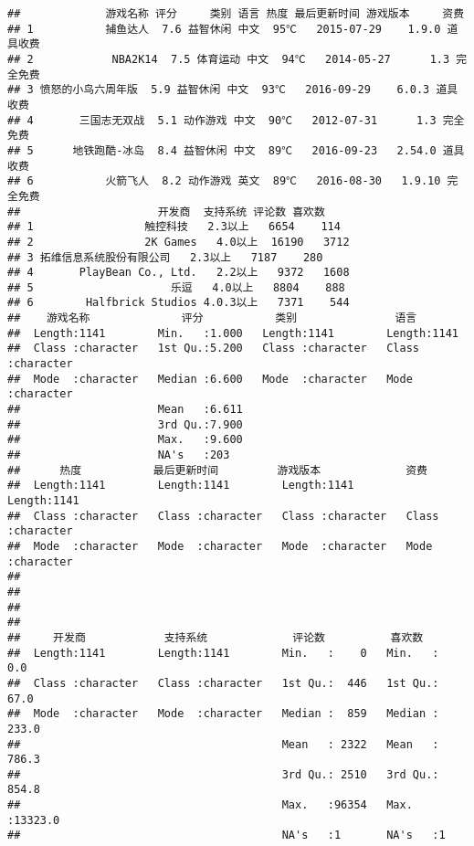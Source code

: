 \documentclass[
]{article}
\begin{document}
\begin{verbatim}
##             游戏名称 评分     类别 语言 热度 最后更新时间 游戏版本     资费
## 1           捕鱼达人  7.6 益智休闲 中文  95℃   2015-07-29    1.9.0 道具收费
## 2            NBA2K14  7.5 体育运动 中文  94℃   2014-05-27      1.3 完全免费
## 3 愤怒的小鸟六周年版  5.9 益智休闲 中文  93℃   2016-09-29    6.0.3 道具收费
## 4       三国志无双战  5.1 动作游戏 中文  90℃   2012-07-31      1.3 完全免费
## 5      地铁跑酷-冰岛  8.4 益智休闲 中文  89℃   2016-09-23   2.54.0 道具收费
## 6           火箭飞人  8.2 动作游戏 英文  89℃   2016-08-30   1.9.10 完全免费
##                     开发商  支持系统 评论数 喜欢数
## 1                 触控科技   2.3以上   6654    114
## 2                 2K Games   4.0以上  16190   3712
## 3 拓维信息系统股份有限公司   2.3以上   7187    280
## 4       PlayBean Co., Ltd.   2.2以上   9372   1608
## 5                     乐逗   4.0以上   8804    888
## 6        Halfbrick Studios 4.0.3以上   7371    544
##    游戏名称              评分           类别               语言          
##  Length:1141        Min.   :1.000   Length:1141        Length:1141       
##  Class :character   1st Qu.:5.200   Class :character   Class :character  
##  Mode  :character   Median :6.600   Mode  :character   Mode  :character  
##                     Mean   :6.611                                        
##                     3rd Qu.:7.900                                        
##                     Max.   :9.600                                        
##                     NA's   :203                                          
##      热度           最后更新时间         游戏版本             资费          
##  Length:1141        Length:1141        Length:1141        Length:1141       
##  Class :character   Class :character   Class :character   Class :character  
##  Mode  :character   Mode  :character   Mode  :character   Mode  :character  
##                                                                             
##                                                                             
##                                                                             
##                                                                             
##     开发商            支持系统             评论数          喜欢数       
##  Length:1141        Length:1141        Min.   :    0   Min.   :    0.0  
##  Class :character   Class :character   1st Qu.:  446   1st Qu.:   67.0  
##  Mode  :character   Mode  :character   Median :  859   Median :  233.0  
##                                        Mean   : 2322   Mean   :  786.3  
##                                        3rd Qu.: 2510   3rd Qu.:  854.8  
##                                        Max.   :96354   Max.   :13323.0  
##                                        NA's   :1       NA's   :1
\end{verbatim}
\end{document}
